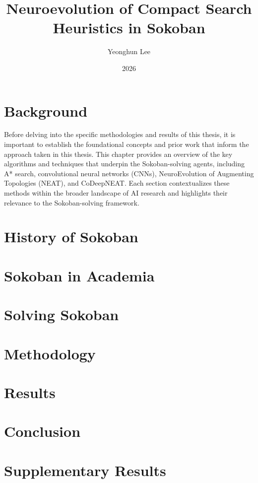 \documentclass[11pt]{report}
\title{Neuroevolution of Compact Search Heuristics in Sokoban}
\author{Yeonghun Lee}
\date{2026}
\begin{document}







\clearpage
\tableofcontents

\doublespacing
{} 
\clearpage
{}


\chapter{Background}

Before delving into the specific methodologies and results of this thesis, it is important to establish the foundational concepts and prior work that inform the approach taken in this thesis. This chapter provides an overview of the key algorithms and techniques that underpin the Sokoban-solving agents, including A* search, convolutional neural networks (CNNs), NeuroEvolution of Augmenting Topologies (NEAT), and CoDeepNEAT. Each section contextualizes these methods within the broader landscape of AI research and highlights their relevance to the Sokoban-solving framework.





\chapter{History of Sokoban}


\chapter{Sokoban in Academia}


\chapter{Solving Sokoban}


\chapter{Methodology}


\chapter{Results}\label{ch:results}


\chapter{Conclusion}


\appendix
\chapter{Supplementary Results}

\singlespacing
\printbibliography
\end{document}
